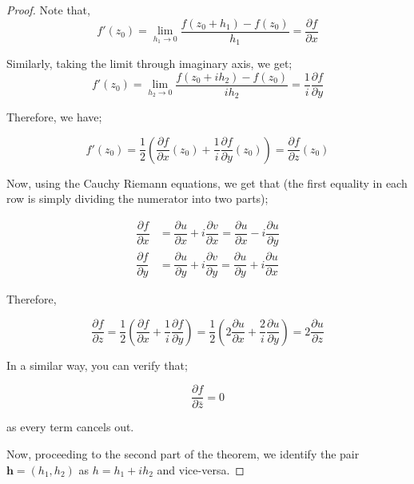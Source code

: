\documentclass[12pt]{article}
\theoremstyle{definition}
\begin{document}
\begin{proof}

Note that,
$$f'(z_0) = \lim_{h_1 \rightarrow 0} \dfrac{f(z_0 + h_1) - f(z_0)}{h_1} = \dfrac{\partial f}{\partial x}$$

Similarly, taking the limit through imaginary axis, we get;
$$f'(z_0) = \lim_{h_2 \rightarrow 0} \dfrac{f(z_0 + ih_2) - f(z_0)}{ih_2} = \dfrac{1}{i}\dfrac{\partial f}{\partial y}$$

Therefore, we have;

\begin{equation*}
    f'(z_0)=\dfrac{1}{2}\left( \dfrac{\partial f}{\partial x}(z_0) + \dfrac{1}{i}\dfrac{\partial f}{\partial y}(z_0) \right)=\dfrac{\partial f}{\partial z}(z_0)
\end{equation*}

Now, using the Cauchy Riemann equations, we get that (the first equality in each row is simply dividing the numerator into two parts);

\begin{align*}
    \dfrac{\partial f}{\partial x} & = \dfrac{\partial u}{\partial x} + i \dfrac{\partial v}{\partial x} = \dfrac{\partial u}{\partial x} - i \dfrac{\partial u}{\partial y}\\
    \dfrac{\partial f}{\partial y} & = \dfrac{\partial u}{\partial y} + i \dfrac{\partial v}{\partial y} = \dfrac{\partial u}{\partial y} + i \dfrac{\partial u}{\partial x}
\end{align*}

Therefore, 

$$\dfrac{\partial f}{\partial z} = \dfrac{1}{2} \left( \dfrac{\partial f}{\partial x} + \dfrac{1}{i} \dfrac{\partial f}{\partial y}\right) = \dfrac{1}{2} \left( 2 \dfrac{\partial u}{\partial x} + \dfrac{2}{i} \dfrac{\partial u}{\partial y} \right) = 2\dfrac{\partial u}{\partial z}$$

In a similar way, you can verify that;

$$\dfrac{\partial f}{\partial \bar{z}} = 0$$

as every term cancels out.


Now, proceeding to the second part of the theorem, we identify the pair $\bm{h}=(h_1,h_2)$ as $h=h_1+i h_2$ and vice-versa.


\end{proof}
\end{document}
